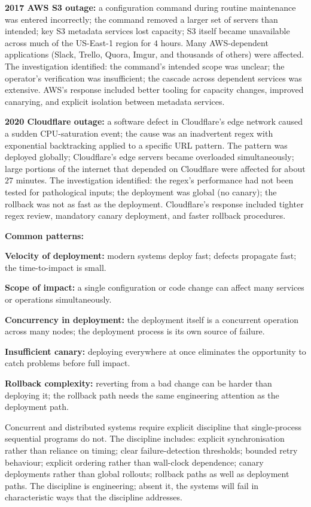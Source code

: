 \textbf{2017 AWS S3 outage:} a configuration command during routine maintenance was entered incorrectly; the command removed a larger set of servers than intended; key S3 metadata services lost capacity; S3 itself became unavailable across much of the US-East-1 region for $4$ hours. Many AWS-dependent applications (Slack, Trello, Quora, Imgur, and thousands of others) were affected. The investigation identified: the command's intended scope was unclear; the operator's verification was insufficient; the cascade across dependent services was extensive. AWS's response included better tooling for capacity changes, improved canarying, and explicit isolation between metadata services.

\textbf{2020 Cloudflare outage:} a software defect in Cloudflare's edge network caused a sudden CPU-saturation event; the cause was an inadvertent regex with exponential backtracking applied to a specific URL pattern. The pattern was deployed globally; Cloudflare's edge servers became overloaded simultaneously; large portions of the internet that depended on Cloudflare were affected for about $27$ minutes. The investigation identified: the regex's performance had not been tested for pathological inputs; the deployment was global (no canary); the rollback was not as fast as the deployment. Cloudflare's response included tighter regex review, mandatory canary deployment, and faster rollback procedures.

\textbf{Common patterns:}

\textbf{Velocity of deployment:} modern systems deploy fast; defects propagate fast; the time-to-impact is small.

\textbf{Scope of impact:} a single configuration or code change can affect many services or operations simultaneously.

\textbf{Concurrency in deployment:} the deployment itself is a concurrent operation across many nodes; the deployment process is its own source of failure.

\textbf{Insufficient canary:} deploying everywhere at once eliminates the opportunity to catch problems before full impact.

\textbf{Rollback complexity:} reverting from a bad change can be harder than deploying it; the rollback path needs the same engineering attention as the deployment path.

\begin{principle}
Concurrent and distributed systems require explicit discipline that single-process sequential programs do not. The discipline includes: explicit synchronisation rather than reliance on timing; clear failure-detection thresholds; bounded retry behaviour; explicit ordering rather than wall-clock dependence; canary deployments rather than global rollouts; rollback paths as well as deployment paths. The discipline is engineering; absent it, the systems will fail in characteristic ways that the discipline addresses.
\end{principle}

